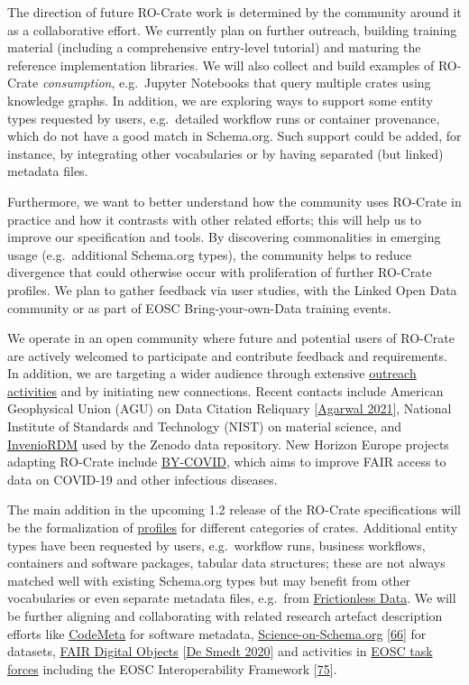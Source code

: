 The direction of future RO-Crate work is determined by the community
around it as a collaborative effort. We currently plan on further
outreach, building training material (including a comprehensive
entry-level tutorial) and maturing the reference implementation
libraries. We will also collect and build examples of RO-Crate
\emph{consumption}, e.g.~Jupyter Notebooks that query multiple crates
using knowledge graphs. In addition, we are exploring ways to support
some entity types requested by users, e.g.~detailed workflow runs or
container provenance, which do not have a good match in Schema.org. Such
support could be added, for instance, by integrating other vocabularies
or by having separated (but linked) metadata files.

Furthermore, we want to better understand how the community uses
RO-Crate in practice and how it contrasts with other related efforts;
this will help us to improve our specification and tools. By discovering
commonalities in emerging usage (e.g.~additional Schema.org types), the
community helps to reduce divergence that could otherwise occur with
proliferation of further RO-Crate profiles. We plan to gather feedback
via user studies, with the Linked Open Data community or as part of EOSC
Bring-your-own-Data training events.

We operate in an open community where future and potential users of
RO-Crate are actively welcomed to participate and contribute feedback
and requirements. In addition, we are targeting a wider audience through
extensive
\href{https://www.researchobject.org/ro-crate/outreach.html}{outreach
activities} and by initiating new connections. Recent contacts include
American Geophysical Union (AGU) on Data Citation Reliquary
{[}\href{https://doi.org/10.5281/zenodo.4916734}{Agarwal 2021}{]}, National
Institute of Standards and Technology (NIST) on material science, and
\href{https://inveniosoftware.org/products/rdm/}{InvenioRDM} used by the
Zenodo data repository. New Horizon Europe projects adapting RO-Crate
include \href{https://by-covid.org/}{BY-COVID}, which aims to improve
FAIR access to data on COVID-19 and other infectious diseases.

The main addition in the upcoming 1.2 release of the RO-Crate
specifications will be the formalization of
\href{https://www.researchobject.org/ro-crate/1.2-DRAFT/profiles}{profiles}
for different categories of crates. Additional entity types have been
requested by users, e.g.~workflow runs, business workflows, containers
and software packages, tabular data structures; these are not always
matched well with existing Schema.org types but may benefit from other
vocabularies or even separate metadata files, e.g.~from
\href{https://frictionlessdata.io/}{Frictionless Data}. We will be
further aligning and collaborating with related research artefact
description efforts like \href{https://codemeta.github.io/}{CodeMeta}
for software metadata,
\href{https://science-on-schema.org/}{Science-on-Schema.org}
{[}\href{https://doi.org/10.5281/zenodo.4477164}{66}{]} for datasets,
\href{https://fairdo.org/}{FAIR Digital Objects}
{[}\href{https://doi.org/10.3390/publications8020021}{De Smedt 2020}{]} and
activities in \href{https://www.eosc.eu/task-force-faq}{EOSC task
forces} including the EOSC Interoperability Framework
{[}\href{https://doi.org/10.2777/620649}{75}{]}.